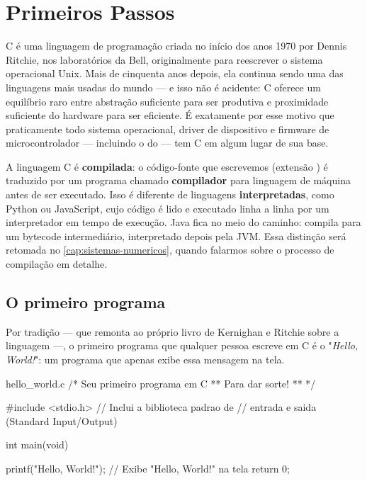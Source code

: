\chapter{Primeiros Passos}
\label{cap:primeiros-passos}

C é uma linguagem de programação criada no início dos anos 1970 por Dennis Ritchie, nos laboratórios da Bell, originalmente para reescrever o sistema operacional Unix. Mais de cinquenta anos depois, ela continua sendo uma das linguagens mais usadas do mundo — e isso não é acidente: C oferece um equilíbrio raro entre abstração suficiente para ser produtiva e proximidade suficiente do hardware para ser eficiente. É exatamente por esse motivo que praticamente todo sistema operacional, driver de dispositivo e firmware de microcontrolador — incluindo o do \ESP{} — tem C em algum lugar de sua base.

\begin{nota}
A linguagem C é \textbf{compilada}: o código-fonte que escrevemos (extensão ) é traduzido por um programa chamado \textbf{compilador} para linguagem de máquina antes de ser executado. Isso é diferente de linguagens \textbf{interpretadas}, como Python ou JavaScript, cujo código é lido e executado linha a linha por um interpretador em tempo de execução. Java fica no meio do caminho: compila para um bytecode intermediário, interpretado depois pela JVM. Essa distinção será retomada no \cref{cap:sistemas-numericos}, quando falarmos sobre o processo de compilação em detalhe.
\end{nota}

\section{O primeiro programa}

Por tradição — que remonta ao próprio livro de Kernighan e Ritchie sobre a linguagem —, o primeiro programa que qualquer pessoa escreve em C é o "\emph{Hello, World!}": um programa que apenas exibe essa mensagem na tela.

\begin{codigoc}{hello\_world.c}
/*
    Seu primeiro programa em C
    ** Para dar sorte! **
*/

#include <stdio.h>          // Inclui a biblioteca padrao de
                            // entrada e saida (Standard Input/Output)

int main(void) {

    printf("Hello, World!\n");   // Exibe "Hello, World!" na tela
    return 0;

}
\end{codigoc}

